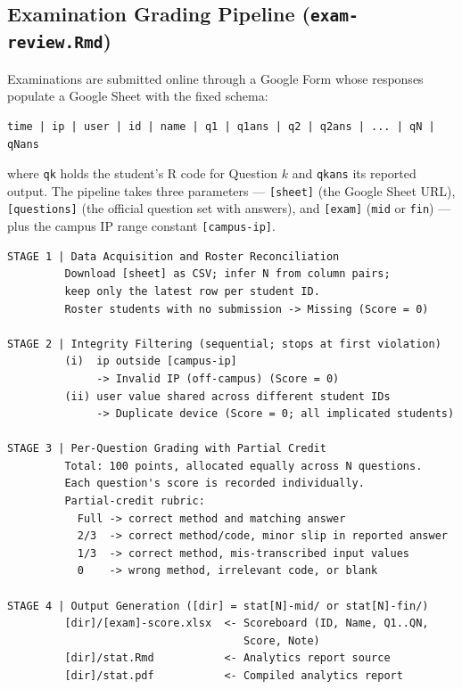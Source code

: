 \documentclass[
]{article}
\begin{document}
\subsection{\texorpdfstring{Examination Grading Pipeline
(\texttt{exam-review.Rmd})}{Examination Grading Pipeline (exam-review.Rmd)}}\label{examination-grading-pipeline-exam-review.rmd}

Examinations are submitted online through a Google Form whose responses
populate a Google Sheet with the fixed schema:

\begin{verbatim}
time | ip | user | id | name | q1 | q1ans | q2 | q2ans | ... | qN | qNans
\end{verbatim}

where \texttt{qk} holds the student's R code for Question \(k\) and
\texttt{qkans} its reported output. The pipeline takes three parameters
--- \texttt{{[}sheet{]}} (the Google Sheet URL),
\texttt{{[}questions{]}} (the official question set with answers), and
\texttt{{[}exam{]}} (\texttt{mid} or \texttt{fin}) --- plus the campus
IP range constant \texttt{{[}campus-ip{]}}.

\begin{verbatim}
STAGE 1 | Data Acquisition and Roster Reconciliation
         Download [sheet] as CSV; infer N from column pairs;
         keep only the latest row per student ID.
         Roster students with no submission -> Missing (Score = 0)

STAGE 2 | Integrity Filtering (sequential; stops at first violation)
         (i)  ip outside [campus-ip]
              -> Invalid IP (off-campus) (Score = 0)
         (ii) user value shared across different student IDs
              -> Duplicate device (Score = 0; all implicated students)

STAGE 3 | Per-Question Grading with Partial Credit
         Total: 100 points, allocated equally across N questions.
         Each question's score is recorded individually.
         Partial-credit rubric:
           Full -> correct method and matching answer
           2/3  -> correct method/code, minor slip in reported answer
           1/3  -> correct method, mis-transcribed input values
           0    -> wrong method, irrelevant code, or blank

STAGE 4 | Output Generation ([dir] = stat[N]-mid/ or stat[N]-fin/)
         [dir]/[exam]-score.xlsx  <- Scoreboard (ID, Name, Q1..QN,
                                     Score, Note)
         [dir]/stat.Rmd           <- Analytics report source
         [dir]/stat.pdf           <- Compiled analytics report
\end{verbatim}
\end{document}
